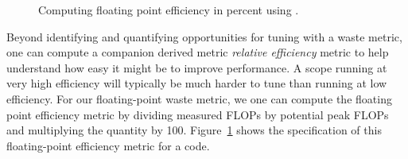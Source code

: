 \documentclass[11pt,twoside,letterpaper]{report}
\begin{document}
\begin{figure}[t]
\caption{Computing floating point efficiency in percent using \hpcviewer{}.}
\label{fig:fpefficiency}
\end{figure}

Beyond identifying and quantifying opportunities for tuning with a waste metric, one can compute a companion derived metric {\em relative efficiency} metric to help understand how easy it might be to improve performance.
A scope running at very high efficiency will typically be much harder to tune than running at low efficiency.
For our floating-point waste metric, we one can compute the floating point efficiency metric by dividing measured FLOPs by potential peak FLOPs and multiplying the quantity by 100.
Figure~\ref{fig:fpefficiency} shows the specification of this floating-point efficiency metric for a code.
\end{document}
